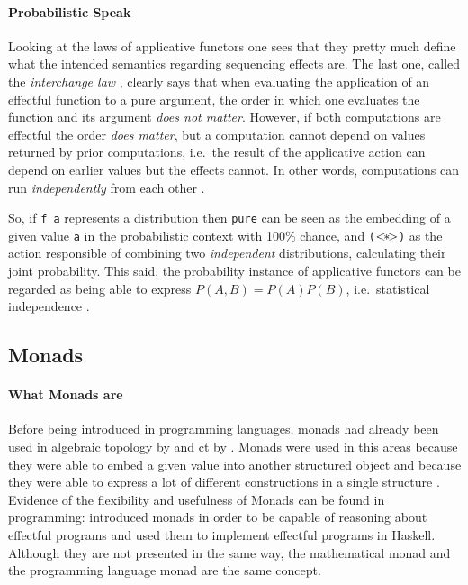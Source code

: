 \documentclass[
  oneside,
  11pt, a4paper,
  footinclude=true,
  headinclude=true,
  cleardoublepage=empty
]{scrbook}
\theoremstyle{definition}
\theoremstyle{definition}
\def\ap{\mathbin{{<\hskip-1ex*\hskip-1ex>}}}
\begin{document}
         \paragraph{Probabilistic Speak}
	            
	Looking at the laws of applicative functors one sees that they pretty much define what the intended semantics regarding sequencing effects are. The last one, called the \emph{interchange law} \citep{mcbride2008applicative}, clearly says that when evaluating the application of an effectful function to a pure argument, the order in which one evaluates the function and its argument \emph{does not matter}. However, if both computations are effectful the order \emph{does matter}, but a computation cannot depend on values returned by prior computations, i.e.\ the result of the applicative action can depend on earlier values but the effects cannot. In other words, computations can run \emph{independently} from each other \citep{Cooper:2008:EFA:1485346.1485361, Marlow:2014:NFA:2692915.2628144, Marlow:2016:DHD:3241625.2976007, andrey2019selective}.
	            
	So, if \texttt{f a} represents a distribution then \texttt{pure} can be seen as the embedding of a given value \texttt{a} in the probabilistic context with 100\% chance, and \texttt{($\ap$)} as the action responsible of combining two \emph{independent} distributions, calculating their joint probability. This said, the probability instance of applicative functors can be regarded as being able to express $P(A, B) = P(A)P(B)$, i.e.\ statistical independence \citep{jtobin}.
	    
	    \subsection{Monads}
	    
	        \paragraph{What Monads are}
	        
	 Before being introduced in programming languages, monads had already been used in algebraic topology by \cite{godement1958topologie} and \gls{ct} by \cite{maclane:71}. Monads were used in this areas because they were able to embed a given value into another structured object and because they were able to express a lot of different constructions in a single structure \citep{DBLP:journals/corr/abs-1803-10195}. Evidence of the flexibility and usefulness of Monads can be found in programming: \cite{Moggi:1991:NCM:116981.116984} introduced monads in order to be capable of reasoning about effectful programs and \cite{1995_wadler_monads} used them to implement effectful programs in Haskell. Although they are not presented in the same way, the mathematical monad and the programming language monad are the same concept.
	            
\end{document}
